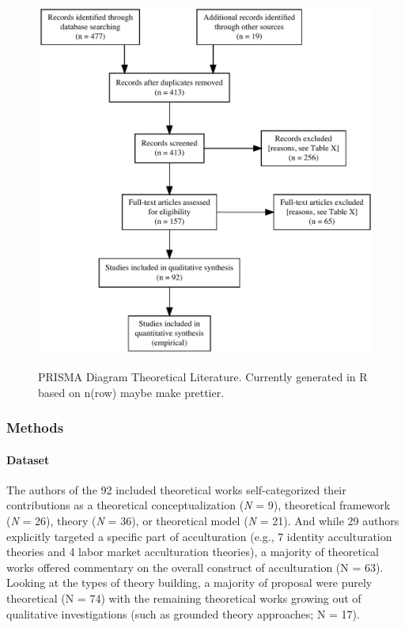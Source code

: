 \begin{figure}[h]
\centering
\caption{PRISMA Diagram Theoretical Literature. Currently generated in R based on n(row) maybe make prettier.}
\includegraphics[width=\textwidth]{Figures/PRISMA_Theories}
\label{fig:PRISMA_Theories}
\end{figure}

\subsubsection{Methods}
\paragraph{Dataset}

The authors of the 92 included theoretical works self-categorized their
contributions as a theoretical conceptualization (\textit{N} = 9),
theoretical framework (\textit{N} = 26), theory (\textit{N} = 36), or
theoretical model (\textit{N} = 21). And while 29 authors explicitly
targeted a specific part of acculturation (e.g., 7 identity
acculturation theories and 4 labor market acculturation theories), a
majority of theoretical works offered commentary on the overall
construct of acculturation (N = 63). Looking at the types of theory
building, a majority of proposal were purely theoretical (N = 74) with
the remaining theoretical works growing out of qualitative
investigations (such as grounded theory approaches; N = 17).


